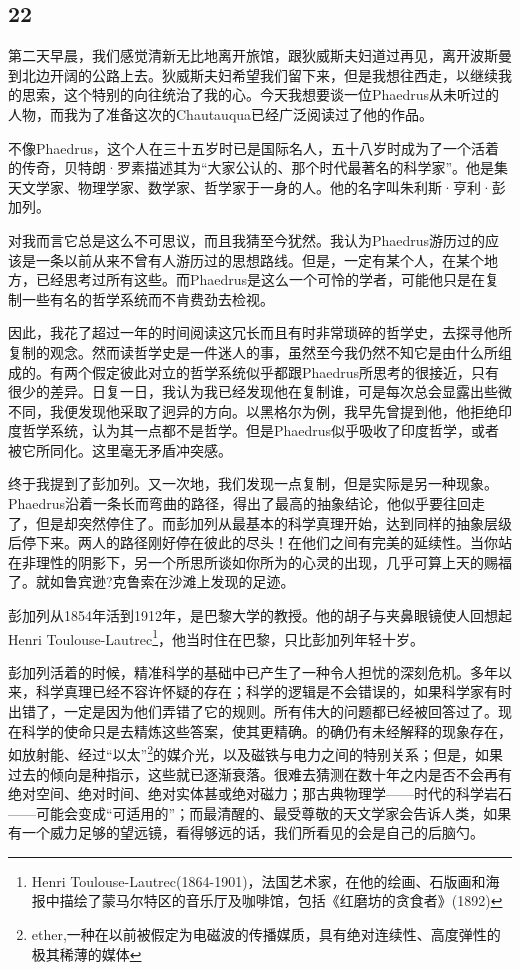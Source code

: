 \documentclass[UTF8]{article}
\begin{document}
\subsection*{22}
\par 第二天早晨，我们感觉清新无比地离开旅馆，跟狄威斯夫妇道过再见，离开波斯曼到北边开阔的公路上去。狄威斯夫妇希望我们留下来，但是我想往西走，以继续我的思索，这个特别的向往统治了我的心。今天我想要谈一位Phaedrus从未听过的人物，而我为了准备这次的Chautauqua已经广泛阅读过了他的作品。
\par 不像Phaedrus，这个人在三十五岁时已是国际名人，五十八岁时成为了一个活着的传奇，贝特朗·罗素描述其为“大家公认的、那个时代最著名的科学家”。他是集天文学家、物理学家、数学家、哲学家于一身的人。他的名字叫朱利斯·亨利·彭加列。
\par 对我而言它总是这么不可思议，而且我猜至今犹然。我认为Phaedrus游历过的应该是一条以前从来不曾有人游历过的思想路线。但是，一定有某个人，在某个地方，已经思考过所有这些。而Phaedrus是这么一个可怜的学者，可能他只是在复制一些有名的哲学系统而不肯费劲去检视。
\par 因此，我花了超过一年的时间阅读这冗长而且有时非常琐碎的哲学史，去探寻他所复制的观念。然而读哲学史是一件迷人的事，虽然至今我仍然不知它是由什么所组成的。有两个假定彼此对立的哲学系统似乎都跟Phaedrus所思考的很接近，只有很少的差异。日复一日，我认为我已经发现他在复制谁，可是每次总会显露出些微不同，我便发现他采取了迥异的方向。以黑格尔为例，我早先曾提到他，他拒绝印度哲学系统，认为其一点都不是哲学。但是Phaedrus似乎吸收了印度哲学，或者被它所同化。这里毫无矛盾冲突感。
\par 终于我提到了彭加列。又一次地，我们发现一点复制，但是实际是另一种现象。Phaedrus沿着一条长而弯曲的路径，得出了最高的抽象结论，他似乎要往回走了，但是却突然停住了。而彭加列从最基本的科学真理开始，达到同样的抽象层级后停下来。两人的路径刚好停在彼此的尽头！在他们之间有完美的延续性。当你站在非理性的阴影下，另一个所思所谈如你所为的心灵的出现，几乎可算上天的赐福了。就如鲁宾逊?克鲁索在沙滩上发现的足迹。
\par 彭加列从1854年活到1912年，是巴黎大学的教授。他的胡子与夹鼻眼镜使人回想起Henri Toulouse-Lautrec\footnote{Henri Toulouse-Lautrec(1864-1901)，法国艺术家，在他的绘画、石版画和海报中描绘了蒙马尔特区的音乐厅及咖啡馆，包括《红磨坊的贪食者》(1892)}，他当时住在巴黎，只比彭加列年轻十岁。
\par 彭加列活着的时候，精准科学的基础中已产生了一种令人担忧的深刻危机。多年以来，科学真理已经不容许怀疑的存在；科学的逻辑是不会错误的，如果科学家有时出错了，一定是因为他们弄错了它的规则。所有伟大的问题都已经被回答过了。现在科学的使命只是去精炼这些答案，使其更精确。的确仍有未经解释的现象存在，如放射能、经过“以太”\footnote{ether,一种在以前被假定为电磁波的传播媒质，具有绝对连续性、高度弹性的极其稀薄的媒体}的媒介光，以及磁铁与电力之间的特别关系；但是，如果过去的倾向是种指示，这些就已逐渐衰落。很难去猜测在数十年之内是否不会再有绝对空间、绝对时间、绝对实体甚或绝对磁力；那古典物理学——时代的科学岩石——可能会变成“可适用的”；而最清醒的、最受尊敬的天文学家会告诉人类，如果有一个威力足够的望远镜，看得够远的话，我们所看见的会是自己的后脑勺。
\end{document}
